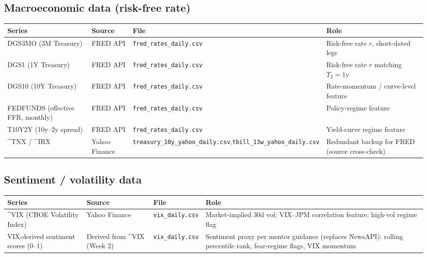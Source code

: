 \documentclass[11pt]{article}
\begin{document}
\subsection{Macroeconomic data (risk-free rate)}
\begin{center}
\small
\begin{tabular}{p{3.3cm} p{2.5cm} p{3.9cm} p{4.3cm}}
\toprule
\textbf{Series} & \textbf{Source} & \textbf{File} & \textbf{Role} \\
\midrule
DGS3MO (3M Treasury) & FRED API & \texttt{fred\_rates\_daily.csv} & Risk-free rate $r$, short-dated legs \\
DGS1 (1Y Treasury) & FRED API & \texttt{fred\_rates\_daily.csv} & Risk-free rate $r$ matching $T_2 = 1$y \\
DGS10 (10Y Treasury) & FRED API & \texttt{fred\_rates\_daily.csv} & Rate-momentum / curve-level feature \\
FEDFUNDS (effective FFR, monthly) & FRED API & \texttt{fred\_rates\_daily.csv} & Policy-regime feature \\
T10Y2Y (10y--2y spread) & FRED API & \texttt{fred\_rates\_daily.csv} & Yield-curve regime feature \\
\^{}TNX / \^{}IRX & Yahoo Finance & \texttt{treasury\_10y\_\newline yahoo\_daily.csv},\newline \texttt{tbill\_13w\_yahoo\newline \_daily.csv} & Redundant backup for FRED (source cross-check) \\
\bottomrule
\end{tabular}
\end{center}

\subsection{Sentiment / volatility data}
\begin{center}
\small
\begin{tabular}{p{3.3cm} p{2.5cm} p{3.9cm} p{4.3cm}}
\toprule
\textbf{Series} & \textbf{Source} & \textbf{File} & \textbf{Role} \\
\midrule
\^{}VIX (CBOE Volatility Index) & Yahoo Finance & \texttt{vix\_daily.csv} & Market-implied 30d vol; VIX--JPM correlation feature; high-vol regime flag \\
VIX-derived sentiment scores (0--1) & Derived from \^{}VIX (Week 2) & \texttt{vix\_daily.csv} & Sentiment proxy per mentor guidance (replaces NewsAPI): rolling percentile rank, fear-regime flags, VIX momentum \\
\bottomrule
\end{tabular}
\end{center}
\end{document}
